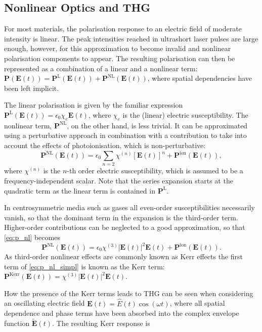 \documentclass[a4paper]{jpconf}
\begin{document}
\subsection{Nonlinear Optics and THG}
For most materials, the polarisation response to an electric field of moderate intensity is linear. The peak intensities reached in ultrashort laser pulses are large enough, however, for this approximation to become invalid and nonlinear polarisation components to appear. The resulting polarisation can then be represented as a combination of a linear and a nonlinear term: $\mathbf{P}(\mathbf{E}(t)) = \mathbf{P}^\text{L}(\mathbf{E}(t)) + \mathbf{P}^\text{NL} (\mathbf{E}(t))$, where spatial dependencies have been left implicit. \par 
The linear polarisation is given by the familiar expression $\mathbf{P}^\text{L}(\mathbf{E}(t)) = \epsilon_0 \chi_e \mathbf{E}(t)$, where $\chi_e$ is the (linear) electric susceptibility. The nonlinear term, $\mathbf{P}^\text{NL}$, on the other hand, is less trivial. It can be approximated using a perturbative approach in combination with a contribution to take into account the effects of photoionisation, which is non-perturbative:
\begin{equation}\label{eq:p_nl}
\mathbf{P}^\text{NL}(\mathbf{E}(t)) = \epsilon_0 \sum_{n=2} \chi^{(n)} [\mathbf{E}(t)]^n + \mathbf{P}^\text{ion}(\mathbf{E}(t)),
\end{equation}
where $\chi^{(n)}$ is the $n$-th order electric susceptibility, which is assumed to be a frequency-independent scalar. Note that the series expansion starts at the quadratic term as the linear term is contained in $\mathbf{P}^\text{L}$.  \par 
In centrosymmetric media such as gases all even-order susceptibilities necessarily vanish, so that the dominant term in the expansion is the third-order term. Higher-order contributions can be neglected to a good approximation, so that \eqref{eq:p_nl} becomes 
\begin{equation}\label{eq:p_nl_simpl}
\mathbf{P}^\text{NL}(\mathbf{E}(t)) = \epsilon_0 \chi^{(3)}|\mathbf{E}(t)|^2 \mathbf{E}(t) + \mathbf{P}^\text{ion}(\mathbf{E}(t)).
\end{equation}
As third-order nonlinear effects are commonly known as Kerr effects the first term of \eqref{eq:p_nl_simpl} is known as the Kerr term: $\mathbf{P}^\text{Kerr}(\mathbf{E}(t)) = \chi^{(3)}|\mathbf{E}(t)|^2 \mathbf{E}(t)$. \par 
How the presence of the Kerr terms leads to THG can be seen when considering an oscillating electric field $\mathbf{E}(t) = \hat{E}(t)\cos(\omega t)$, where all spatial dependence and phase terms have been absorbed into the complex envelope function $\tilde{\mathbf{E}}(t)$. The resulting Kerr response is 
\end{document}
